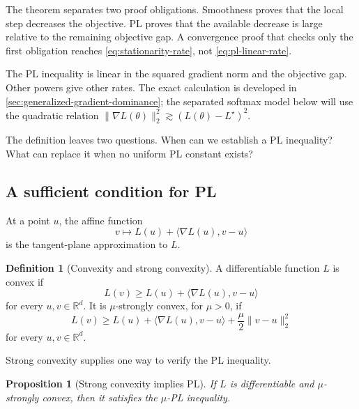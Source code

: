 \documentclass[11pt,twoside]{article}
\newcommand{\R}{\mathbb R}
\newtheorem{proposition}[theorem]{Proposition}
\theoremstyle{definition}
\newtheorem{definition}[theorem]{Definition}
\theoremstyle{remark}
\begin{document}
The theorem separates two proof obligations. Smoothness proves that the local
step decreases the objective. PL proves that the available decrease is large
relative to the remaining objective gap. A convergence proof that checks only
the first obligation reaches \cref{eq:stationarity-rate}, not
\cref{eq:pl-linear-rate}.

The PL inequality is linear in the squared gradient norm and the objective
gap. Other powers give other rates. The exact calculation is developed in
\cref{sec:generalized-gradient-dominance}; the separated softmax model below
will use the quadratic relation
$\|\nabla L(\theta)\|_2^2\gtrsim(L(\theta)-L^\star)^2$.

The definition leaves two questions. When can we establish a PL inequality?
What can replace it when no uniform PL constant exists?

\subsection{A sufficient condition for PL}

At a point $u$, the affine function
\[
 v\longmapsto L(u)+\langle\nabla L(u),v-u\rangle
\]
is the tangent-plane approximation to $L$.

\begin{definition}[Convexity and strong convexity]
\label{def:convex-strong}
A differentiable function $L$ is convex if
\begin{equation}
 L(v)\ge L(u)+\langle\nabla L(u),v-u\rangle
 \label{eq:convex-first-order}
\end{equation}
for every $u,v\in\R^d$. It is $\mu$-strongly convex, for $\mu>0$, if
\begin{equation}
 L(v)\ge L(u)+\langle\nabla L(u),v-u\rangle
             +\frac\mu2\|v-u\|_2^2
 \label{eq:strong-convex-first-order}
\end{equation}
for every $u,v\in\R^d$.
\end{definition}

Strong convexity supplies one way to verify the PL inequality.

\begin{proposition}[Strong convexity implies PL]
\label{prop:strong-implies-pl}
If $L$ is differentiable and $\mu$-strongly convex, then it satisfies the
$\mu$-PL inequality.
\end{proposition}
\end{document}
